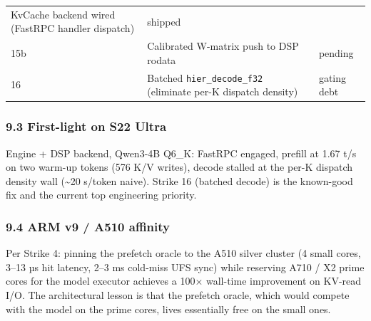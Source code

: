 \documentclass[
  11pt,
]{article}
\begin{document}
\begin{longtable}[]{@{}lll@{}}
\begin{minipage}[t]{0.26\columnwidth}
KvCache backend wired (FastRPC handler dispatch)\strut
\end{minipage} & \begin{minipage}[t]{0.30\columnwidth}\raggedright
shipped\strut
\end{minipage}\tabularnewline
\begin{minipage}[t]{0.35\columnwidth}\raggedright
15b\strut
\end{minipage} & \begin{minipage}[t]{0.26\columnwidth}\raggedright
Calibrated W-matrix push to DSP rodata\strut
\end{minipage} & \begin{minipage}[t]{0.30\columnwidth}\raggedright
pending\strut
\end{minipage}\tabularnewline
\begin{minipage}[t]{0.35\columnwidth}\raggedright
16\strut
\end{minipage} & \begin{minipage}[t]{0.26\columnwidth}\raggedright
Batched \texttt{hier\_decode\_f32} (eliminate per-K dispatch
density)\strut
\end{minipage} & \begin{minipage}[t]{0.30\columnwidth}\raggedright
gating debt\strut
\end{minipage}\tabularnewline
\bottomrule
\end{longtable}

\hypertarget{first-light-on-s22-ultra}{%
\subsubsection{9.3 First-light on S22
Ultra}\label{first-light-on-s22-ultra}}

Engine + DSP backend, Qwen3-4B Q6\_K: FastRPC engaged, prefill at 1.67
t/s on two warm-up tokens (576 K/V writes), decode stalled at the per-K
dispatch density wall (\textasciitilde20 s/token naive). Strike 16
(batched decode) is the known-good fix and the current top engineering
priority.

\hypertarget{arm-v9-a510-affinity}{%
\subsubsection{9.4 ARM v9 / A510 affinity}\label{arm-v9-a510-affinity}}

Per Strike 4: pinning the prefetch oracle to the A510 silver cluster (4
small cores, 3--13 µs hit latency, 2--3 ms cold-miss UFS sync) while
reserving A710 / X2 prime cores for the model executor achieves a 100×
wall-time improvement on KV-read I/O. The architectural lesson is that
the prefetch oracle, which would compete with the model on the prime
cores, lives essentially free on the small ones.
\end{document}
